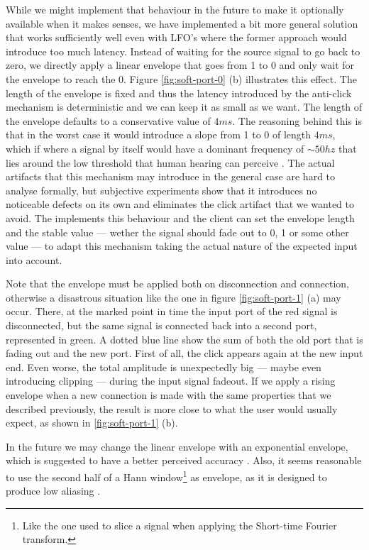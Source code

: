 While we might implement that behaviour in the future to make it
optionally available when it makes senses, we have implemented a bit
more general solution that works sufficiently well even with LFO's
where the former approach would introduce too much latency. Instead of
waiting for the source signal to go back to zero, we directly apply a
linear envelope that goes from 1 to 0 and only wait for the envelope
to reach the 0. Figure \ref{fig:soft-port-0} (b) illustrates this
effect. The length of the envelope is fixed and thus the latency
introduced by the anti-click mechanism is deterministic and we can
keep it as small as we want. The length of the envelope defaults to a
conservative value of $4 ms$. The reasoning behind this is that in the
worst case it would introduce a slope from 1 to 0 of length $4ms$,
which if where a signal by itself would have a dominant frequency of
$\sim 50 hz$ that lies around the low threshold that human hearing can
perceive \cite{goldstein01sensation}. The actual artifacts that this
mechanism may introduce in the general case are hard to analyse
formally, but subjective experiments show that it introduces no
noticeable defects on its own and eliminates the click artifact that
we wanted to avoid. The  implements this
behaviour and the client can set the envelope length and the stable
value --- wether the signal should fade out to 0, 1 or some other
value --- to adapt this mechanism taking the actual nature of the
expected input into account.

Note that the envelope must be applied both on disconnection and
connection, otherwise a disastrous situation like the one in figure
\ref{fig:soft-port-1} (a) may occur. There, at the marked point in
time the input port of the red signal is disconnected, but the same
signal is connected back into a second port, represented in green. A
dotted blue line show the sum of both the old port that is fading out
and the new port. First of all, the click appears again at the new
input end. Even worse, the total amplitude is unexpectedly big ---
maybe even introducing clipping --- during the input signal
fadeout. If we apply a rising envelope when a new connection is made
with the same properties that we described previously, the result is
more close to what the user would usually expect, as shown in
\ref{fig:soft-port-1} (b).

In the future we may change the linear envelope with an exponential
envelope, which is suggested to have a better perceived accuracy
\cite{boulanger10audio}. Also, it seems reasonable to use the second
half of a Hann window\footnote{Like the one used to slice a signal
  when applying the Short-time Fourier transform.} as envelope, as it
is designed to produce low aliasing \cite{blackman59measurement}.


